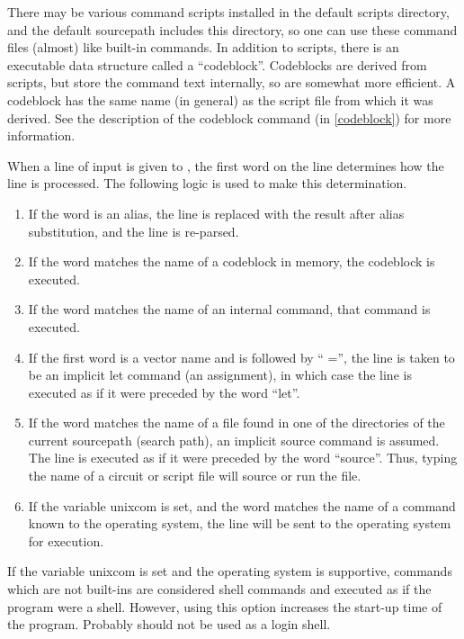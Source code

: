 There may be various command scripts installed in the default scripts
directory, and the default {\et sourcepath} includes this directory,
so one can use these command files (almost) like built-in commands. 
In addition to scripts, there is an executable data structure called a
``codeblock''.  Codeblocks are derived from scripts, but store the
command text internally, so are somewhat more efficient.  A codeblock
has the same name (in general) as the script file from which it was
derived.  See the description of the {\cb codeblock} command (in
\ref{codeblock}) for more information.

When a line of input is given to {\WRspice}, the first word on the
line determines how the line is processed.  The following logic is
used to make this determination.

\begin{enumerate}
\item{If the word is an alias, the line is replaced with the result
after alias substitution, and the line is re-parsed.}

\item{If the word matches the name of a codeblock in memory, the
codeblock is executed.}

\item{If the word matches the name of an internal command, that
command is executed.}

\item{If the first word is a vector name and is followed by ``{\vt
=}'', the line is taken to be an implicit {\cb let} command (an
assignment), in which case the line is executed as if it were preceded
by the word ``let''.}

\item{If the word matches the name of a file found in one of the
directories of the current {\et sourcepath} (search path), an implicit
{\cb source} command is assumed.  The line is executed as if it were
preceded by the word ``source''.  Thus, typing the name of a circuit
or script file will source or run the file.}

\item{If the variable {\et unixcom} is set, and the word matches the
name of a command known to the operating system, the line will be sent
to the operating system for execution.}
\end{enumerate}

If the variable {\et unixcom} is set and the operating system is
supportive, commands which are not built-ins are considered shell
commands and executed as if the program were a shell.  However, using
this option increases the start-up time of the program.  Probably
{\WRspice} should not be used as a login shell.

